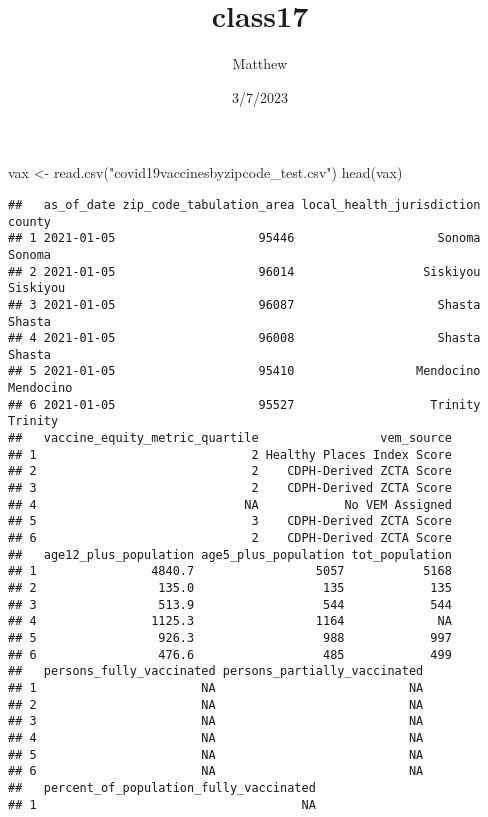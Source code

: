\documentclass[
]{article}
\title{class17}
\author{Matthew}
\date{3/7/2023}
\newenvironment{Shaded}{\begin{snugshade}}{\end{snugshade}}
\newcommand{\FunctionTok}[1]{\textcolor[rgb]{0.00,0.00,0.00}{#1}}
\newcommand{\NormalTok}[1]{#1}
\newcommand{\OtherTok}[1]{\textcolor[rgb]{0.56,0.35,0.01}{#1}}
\newcommand{\StringTok}[1]{\textcolor[rgb]{0.31,0.60,0.02}{#1}}
\begin{document}
\maketitle

\begin{Shaded}
\begin{Highlighting}[]
\NormalTok{vax }\OtherTok{\textless{}{-}} \FunctionTok{read.csv}\NormalTok{(}\StringTok{"covid19vaccinesbyzipcode\_test.csv"}\NormalTok{)}
\FunctionTok{head}\NormalTok{(vax)}
\end{Highlighting}
\end{Shaded}

\begin{verbatim}
##   as_of_date zip_code_tabulation_area local_health_jurisdiction    county
## 1 2021-01-05                    95446                    Sonoma    Sonoma
## 2 2021-01-05                    96014                  Siskiyou  Siskiyou
## 3 2021-01-05                    96087                    Shasta    Shasta
## 4 2021-01-05                    96008                    Shasta    Shasta
## 5 2021-01-05                    95410                 Mendocino Mendocino
## 6 2021-01-05                    95527                   Trinity   Trinity
##   vaccine_equity_metric_quartile                 vem_source
## 1                              2 Healthy Places Index Score
## 2                              2    CDPH-Derived ZCTA Score
## 3                              2    CDPH-Derived ZCTA Score
## 4                             NA            No VEM Assigned
## 5                              3    CDPH-Derived ZCTA Score
## 6                              2    CDPH-Derived ZCTA Score
##   age12_plus_population age5_plus_population tot_population
## 1                4840.7                 5057           5168
## 2                 135.0                  135            135
## 3                 513.9                  544            544
## 4                1125.3                 1164             NA
## 5                 926.3                  988            997
## 6                 476.6                  485            499
##   persons_fully_vaccinated persons_partially_vaccinated
## 1                       NA                           NA
## 2                       NA                           NA
## 3                       NA                           NA
## 4                       NA                           NA
## 5                       NA                           NA
## 6                       NA                           NA
##   percent_of_population_fully_vaccinated
## 1                                     NA

\end{verbatim}
\end{document}
